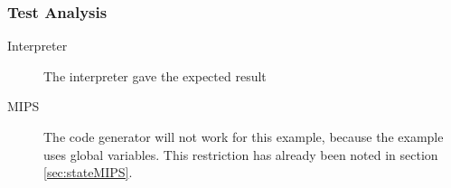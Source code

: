\subsubsection{Test Analysis}
\begin{description}
	\item[Interpreter] The interpreter gave the expected result
	\item[MIPS] The code generator will not work for this example, because the example uses global variables. This restriction has already been noted in section \ref{sec:stateMIPS}.
\end{description}